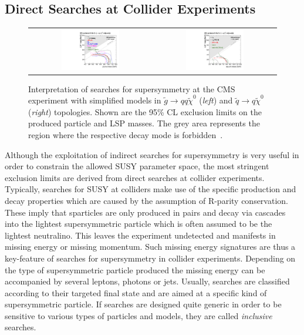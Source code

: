 \subsection{Direct Searches at Collider Experiments}
\label{subsec:susy_collider}
\begin{figure}[!tp]
  \centering 
  \begin{tabular}{cc}
    \includegraphics[width=0.49\textwidth]{figures/T1_7TeV.pdf} &
    \includegraphics[width=0.49\textwidth]{figures/T2_7TeV.pdf}
  \end{tabular}
  \caption{Interpretation of searches for supersymmetry at the CMS experiment with simplified models in $\tilde{g} \rightarrow qq\tilde{\chi}^0$ (\textit{left}) and $\tilde{q} \rightarrow q \tilde{\chi}^0$ (\textit{right}) topologies. Shown are the 95\% CL exclusion limits on the produced particle and LSP masses. The grey area represents the region where the respective decay mode is forbidden~\cite{Chatrchyan:2013sza}.}
  \label{fig:SMS_7TeV}
\end{figure}
Although the exploitation of indirect searches for supersymmetry is very useful in order to constrain the allowed SUSY parameter space, the most stringent exclusion limits are derived from direct searches at collider experiments. Typically, searches for SUSY at colliders make use of the specific production and decay properties which are caused by the assumption of R-parity conservation. These imply that sparticles are only produced in pairs and decay via cascades into the lightest supersymmetric particle which is often assumed to be the lightest neutralino. This leaves the experiment undetected and manifests in missing energy or missing momentum. Such missing energy signatures are thus a key-feature of searches for supersymmetry in collider experiments. Depending on the type of supersymmetric particle produced the missing energy can be accompanied by several leptons, photons or jets. Usually, searches are classified according to their targeted final state and are aimed at a specific kind of supersymmetric particle. If searches are designed quite generic in order to be sensitive to various types of particles and models, they are called \textit{inclusive} searches. \\  
